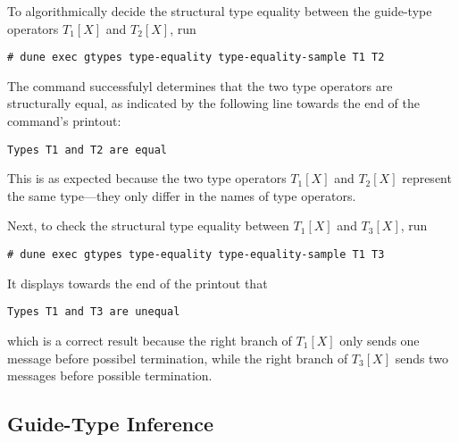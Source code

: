 To algorithmically decide the structural type equality between the guide-type
operators $T_1 [X]$ and $T_2 [X]$, run
\begin{verbatim}
# dune exec gtypes type-equality type-equality-sample T1 T2
\end{verbatim}
%
The command successfulyl determines that the two type operators are structurally
equal, as indicated by the following line towards the end of the command's
printout:
\begin{verbatim}
Types T1 and T2 are equal
\end{verbatim}
%
This is as expected because the two type operators $T_1 [X]$ and $T_2 [X]$
represent the same type---they only differ in the names of type operators.

Next, to check the structural type equality between $T_1 [X]$ and $T_3 [X]$, run
\begin{verbatim}
# dune exec gtypes type-equality type-equality-sample T1 T3
\end{verbatim}
%
It displays towards the end of the printout that
\begin{verbatim}
Types T1 and T3 are unequal
\end{verbatim}
which is a correct result because the right branch of $T_1 [X]$ only sends one
message before possibel termination, while the right branch of $T_3 [X]$ sends
two messages before possible termination.

\subsection{Guide-Type Inference}

